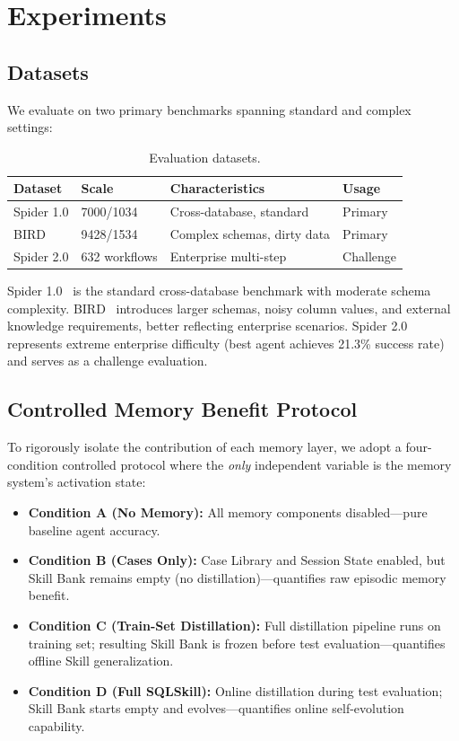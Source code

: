 
\section{Experiments}
\label{sec:experiments}

\subsection{Datasets}
\label{subsec:datasets}

We evaluate on two primary benchmarks spanning standard and complex settings:

\begin{table}[h]
  \centering
  \small
  \caption{Evaluation datasets.}
  \label{tab:datasets}
  \begin{tabular}{llll}
    \toprule
    Dataset & Scale & Characteristics & Usage \\
    \midrule
    Spider 1.0 & 7000/1034 & Cross-database, standard & Primary \\
    BIRD & 9428/1534 & Complex schemas, dirty data & Primary \\
    Spider 2.0 & 632 workflows & Enterprise multi-step & Challenge \\
    \bottomrule
  \end{tabular}
\end{table}

Spider 1.0~\cite{yu2018spider} is the standard cross-database benchmark with moderate schema complexity. BIRD~\cite{li2023bird} introduces larger schemas, noisy column values, and external knowledge requirements, better reflecting enterprise scenarios. Spider 2.0~\cite{lei2024spider2} represents extreme enterprise difficulty (best agent achieves 21.3\% success rate) and serves as a challenge evaluation.

\subsection{Controlled Memory Benefit Protocol}
\label{subsec:protocol}

To rigorously isolate the contribution of each memory layer, we adopt a four-condition controlled protocol where the \emph{only} independent variable is the memory system's activation state:

\begin{itemize}
  \item \textbf{Condition A (No Memory):} All memory components disabled---pure baseline agent accuracy.
  \item \textbf{Condition B (Cases Only):} Case Library and Session State enabled, but Skill Bank remains empty (no distillation)---quantifies raw episodic memory benefit.
  \item \textbf{Condition C (Train-Set Distillation):} Full distillation pipeline runs on training set; resulting Skill Bank is frozen before test evaluation---quantifies offline Skill generalization.
  \item \textbf{Condition D (Full SQLSkill):} Online distillation during test evaluation; Skill Bank starts empty and evolves---quantifies online self-evolution capability.
\end{itemize}

